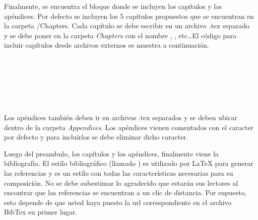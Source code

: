 Finalmente, se encuentra el bloque donde se incluyen los capítulos y los apéndices.  Por defecto se incluyen los 5 capítulos propuestos que se encuentran en la carpeta /Chapters. Cada capítulo se debe escribir en un archivo .tex separado y se debe poner en la carpeta \emph{Chapters} con el nombre , , etc\ldots El código para incluir capítulos desde archivos externos se muestra a continuación.

\begin{verbatim}
	
	 
	
	 
	 
\end{verbatim}

Los apéndices también deben ir en archivos .tex separados y se deben ubicar dentro de la carpeta \emph{Appendices}. Los apéndices vienen comentados con el caracter \code{\%} por defecto y para incluirlos se debe eliminar dicho caracter.

Luego del preambulo, los capítulos y los apéndices, finalmente viene la bibliografía. El estilo bibliográfico (llamado ) es utilizado por \LaTeX{} para generar las referencias y es un estilo con todas las características necesarias para su composición.  No se debe subestimar lo agradecido que estarán sus lectores al encontrar que las referencias se encuentran a un clic de distancia.  Por supuesto, esto depende de que usted haya puesto la url correspondiente en el archivo BibTex en primer lugar.








